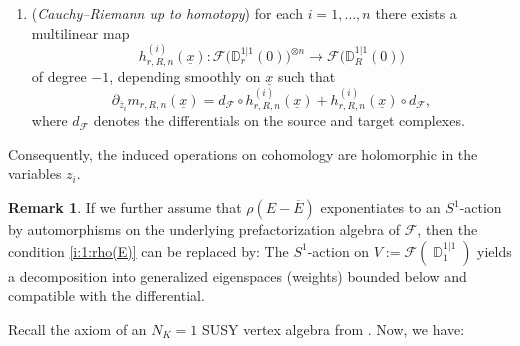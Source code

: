 \documentclass[final,reqno]{amsart}
\numberwithin{equation}{section}
\theoremstyle{definition}
\newtheorem{rmk}[thm]{Remark}
\newcommand{\ol}{\overline}
\newcommand{\ul}{\underline}
\newcommand{\lto}{\longrightarrow}
\newcommand{\sD}{\mathbb{D}^{1|1}}
\newcommand{\clF}{\mathcal{F}}
\newcommand{\pd}{\partial}
\DeclareMathOperator{\bbD}{\mathbb{D}}
\begin{document}
\begin{clist}
\begin{enumerate}
\item[(b)]
(\emph{Cauchy--Riemann up to homotopy}) 
for each $i=1,\dotsc,n$ there exists a multilinear map
\[
 h^{(i)}_{r,R,n}(\ul{x})\colon
 \clF\bigl(\sD_r(0)\bigr)^{\otimes n} \lto 
 \clF\bigl(\sD_R(0)\bigr)
\]
of degree $-1$, depending smoothly on $\underline{x}$ such that
\[
 \pd_{\ol{z}_i} m_{r,R,n}(\ul{x}) =
 d_{\clF} \circ h^{(i)}_{r,R,n}(\ul{x}) + 
 h^{(i)}_{r,R,n}(\ul{x}) \circ d_{\clF},
\]
where $d_{\clF}$ denotes the differentials on the source and target complexes.
\end{enumerate}
Consequently, the induced operations on cohomology 
are holomorphic in the variables $z_i$.
\end{clist}

\begin{rmk}
If we further assume that $\rho(E-\ol{E})$ exponentiates to an $S^1$-action 
by automorphisms on the underlying prefactorization algebra of $\clF$, 
then the condition \ref{i:1:rho(E)} can be replaced by:
The $S^1$-action on $V:=\clF(\bbD_1^{1|1})$ yields 
a decomposition into generalized eigenspaces (weights) 
bounded below and compatible with the differential.
\end{rmk}

Recall the axiom of an $N_K=1$ SUSY vertex algebra 
from \cite[Definition 4.10]{HK}.
Now, we have:
\end{document}
